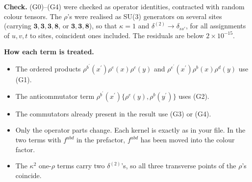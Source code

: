 \documentclass[10pt]{article}
\numberwithin{equation}{section}
\begin{document}
\noindent\textbf{Check.} (G0)--(G4) were checked as operator identities, contracted with random colour tensors. The $\rho$'s were realised as SU(3) generators on several sites (carrying $\mathbf3,\mathbf3,\mathbf3,\mathbf8$, or $\mathbf3,\mathbf3,\mathbf8$), so that $\kappa=1$ and $\delta^{(2)}\to\delta_{ss'}$, for all assignments of $u,v,t$ to sites, coincident ones included. The residuals are below $2\times10^{-15}$.

\noindent\textbf{How each term is treated.}
\begin{itemize}
\item The ordered products $\rho^{b^{\prime}}(x^{\prime})\rho^{e}(x)\rho^{c}(y)$ and $\rho^{e^{\prime}}(x^{\prime})\rho^{b}(x)\rho^{d}(y)$ use (G1).
\item The anticommutator term $\rho^{b^{\prime}}(x^{\prime})\{\rho^{e}(y),\rho^{b}(y^{\prime})\}$ uses (G2).
\item The commutators already present in the result use (G3) or (G4).
\item Only the operator parts change. Each kernel is exactly as in your file. In the two terms with $f^{abd}$ in the prefactor, $f^{abd}$ has been moved into the colour factor.
\item The $\kappa^{2}$ one-$\rho$ terms carry two $\delta^{(2)}$'s, so all three transverse points of the $\rho$'s coincide.
\end{itemize}
\end{document}
